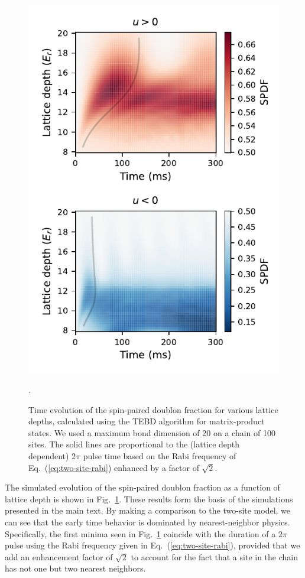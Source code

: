 \documentclass[aps,prl,twocolumn,superscriptaddress]{revtex4-1}
\begin{document}
\begin{figure}
    \centering
    \includegraphics[width=\columnwidth]{figs/mps-figures/mps-heatmaps-realistic-lattice-parameters.pdf}
    \caption{Time evolution of the spin-paired doublon fraction for various lattice depths, calculated using the TEBD algorithm for matrix-product states. We used a maximum bond dimension of 20 on a chain of 100 sites. The solid lines are proportional to the (lattice depth dependent) 2$\pi$ pulse time based on the Rabi frequency of Eq.~(\ref{eq:two-site-rabi}) enhanced by a factor of $\sqrt{2}$.}.
    \label{fig:full-mps-results}
\end{figure}

The simulated evolution of the spin-paired doublon fraction as a function of lattice depth is shown in Fig.~\ref{fig:full-mps-results}. These results form the basis of the simulations presented in the main text. By making a comparison to the two-site model, we can see that the early time behavior is dominated by nearest-neighbor physics. Specifically, the first minima seen in Fig.~\ref{fig:full-mps-results} coincide with the duration of a 2$\pi$ pulse using the Rabi frequency given in Eq.~(\ref{eq:two-site-rabi}), provided that we add an enhancement factor of $\sqrt{2}$ to account for the fact that a site in the chain has not one but two nearest neighbors.
\end{document}
